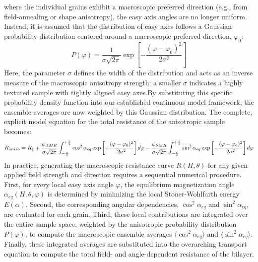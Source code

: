\documentclass[11pt,a4paper]{article}
\begin{document}
 where the individual grains exhibit a macroscopic preferred direction (e.g., from field-annealing or shape anisotropy), the easy axis angles are no longer uniform. Instead, it is assumed that the distribution of easy axes follows a Gaussian probability distribution centered around a macroscopic preferred direction, $\varphi_0$:\begin{equation}P(\varphi) = \frac{1}{\sigma\sqrt{2\pi}} \exp\left[ - \frac{(\varphi - \varphi_0)^2}{2\sigma^2} \right]\end{equation}Here, the parameter $\sigma$ defines the width of the distribution and acts as an inverse measure of the macroscopic anisotropy strength; a smaller $\sigma$ indicates a highly textured sample with tightly aligned easy axes.By substituting this specific probability density function into our established continuous model framework, the ensemble averages are now weighted by this Gaussian distribution. The complete, explicit model equation for the total resistance of the anisotropic sample becomes:\begin{multline}R_{aniso} = R_{\parallel} + \frac{\psi_{AMR}}{\sigma\sqrt{2\pi}} \int_{-\frac{\pi}{2}}^{+\frac{\pi}{2}} \cos^2\alpha_{eq} \exp\left[ - \frac{(\varphi - \varphi_0)^2}{2\sigma^2} \right] d\varphi - \- \frac{\psi_{SMR}}{\sigma\sqrt{2\pi}} \int_{-\frac{\pi}{2}}^{+\frac{\pi}{2}} \sin^2\alpha_{eq} \exp\left[ - \frac{(\varphi - \varphi_0)^2}{2\sigma^2} \right] d\varphi\end{multline}
In practice, generating the macroscopic resistance curve $R(H, \theta)$ for any given applied field strength and direction requires a sequential numerical procedure. First, for every local easy axis angle $\varphi$, the equilibrium magnetization angle $\alpha_{eq}(H, \theta, \varphi)$ is determined by minimizing the local Stoner-Wohlfarth energy $E(\alpha)$. Second, the corresponding angular dependencies, $\cos^2\alpha_{eq}$ and $\sin^2\alpha_{eq}$, are evaluated for each grain. Third, these local contributions are integrated over the entire sample space, weighted by the anisotropic probability distribution $P(\varphi)$, to compute the macroscopic ensemble averages $\langle \cos^2\alpha_{eq} \rangle$ and $\langle \sin^2\alpha_{eq} \rangle$. Finally, these integrated averages are substituted into the overarching transport equation to compute the total field- and angle-dependent resistance of the bilayer.\\
\end{document}

